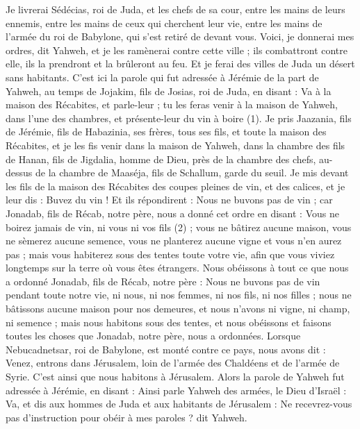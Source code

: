 \begin{multicols}{2}
Je livrerai Sédécias, roi de Juda, et les chefs de sa cour, entre les mains de leurs ennemis, entre les mains de ceux qui cherchent leur vie, entre les mains de l'armée du roi de Babylone, qui s'est retiré de devant vous.
Voici, je donnerai mes ordres, dit Yahweh, et je les ramènerai contre cette ville ; ils combattront contre elle, ils la prendront et la brûleront au feu. Et je ferai des villes de Juda un désert sans habitants.
\VerseOne{}C'est ici la parole qui fut adressée à Jérémie de la part de Yahweh, au temps de Jojakim, fils de Josias, roi de Juda, en disant :
Va à la maison des Récabites, et parle-leur ; tu les feras venir à la maison de Yahweh, dans l’une des chambres, et présente-leur du vin à boire\FTNT{} (1).
Je pris Jaazania, fils de Jérémie, fils de Habazinia, ses frères, tous ses fils, et toute la maison des Récabites,
et je les fis venir dans la maison de Yahweh, dans la chambre des fils de Hanan, fils de Jigdalia, homme de Dieu, près de la chambre des chefs, au-dessus de la chambre de Maaséja, fils de Schallum, garde du seuil.
Je mis devant les fils de la maison des Récabites des coupes pleines de vin, et des calices, et je leur dis : Buvez du vin !
Et ils répondirent : Nous ne buvons pas de vin ; car Jonadab, fils de Récab, notre père, nous a donné cet ordre en disant : Vous ne boirez jamais de vin, ni vous ni vos fils\FTNT{} (2) ;
vous ne bâtirez aucune maison, vous ne sèmerez aucune semence, vous ne planterez aucune vigne et vous n'en aurez pas ; mais vous habiterez sous des tentes toute votre vie, afin que vous viviez longtemps sur la terre où vous êtes étrangers.
Nous obéissons à tout ce que nous a ordonné Jonadab, fils de Récab, notre père : Nous ne buvons pas de vin pendant toute notre vie, ni nous, ni nos femmes, ni nos fils, ni nos filles ;
nous ne bâtissons aucune maison pour nos demeures, et nous n'avons ni vigne, ni champ, ni semence ;
mais nous habitons sous des tentes, et nous obéissons et faisons toutes les choses que Jonadab, notre père, nous a ordonnées.
Lorsque Nebucadnetsar, roi de Babylone, est monté contre ce pays, nous avons dit : Venez, entrons dans Jérusalem, loin de l'armée des Chaldéens et de l'armée de Syrie. C’est ainsi que nous habitons à Jérusalem.
Alors la parole de Yahweh fut adressée à Jérémie, en disant :
Ainsi parle Yahweh des armées, le Dieu d'Israël : Va, et dis aux hommes de Juda et aux habitants de Jérusalem : Ne recevrez-vous pas d'instruction pour obéir à mes paroles ? dit Yahweh.

\end{multicols}
